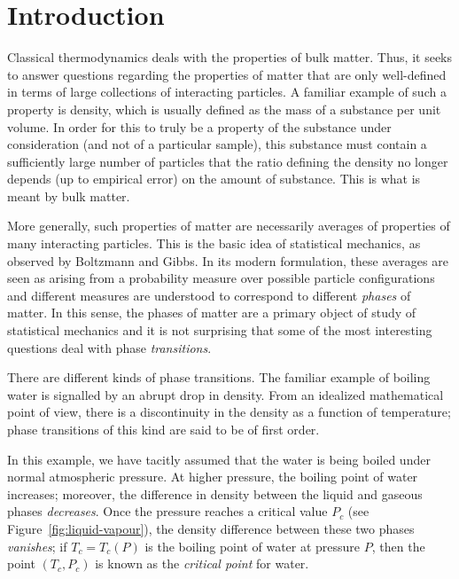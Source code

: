
\chapter{Introduction}


Classical thermodynamics deals with the properties of bulk matter. Thus, it seeks
to answer questions regarding the properties of matter that are only well-defined
in terms of large collections of interacting particles. A familiar example of
such a property is density, which is usually defined as the mass of a substance
per unit volume. In order for this to truly be a property of the substance under
consideration (and not of a particular sample), this substance must contain a
sufficiently large number of particles that the ratio defining the density
no longer depends (up to empirical error) on the amount of substance. This is
what is meant by bulk matter.

More generally, such properties of matter are necessarily averages of properties
of many interacting particles. This is the basic idea of statistical mechanics,
as observed by Boltzmann and Gibbs. In its modern formulation, these averages
are seen as arising from a probability measure over possible particle configurations
and different measures are understood to correspond to different \emph{phases}
of matter. In this sense, the phases of matter are a primary object of study
of statistical mechanics and it is not surprising that some of the most interesting
questions deal with phase \emph{transitions}.

There are different kinds of phase transitions. The familiar example of boiling
water is signalled by an abrupt drop in density. From an idealized mathematical
point of view, there is a discontinuity in the density as a function of temperature;
phase transitions of this kind are said to be of first order.

In this example,
we have tacitly assumed that the water is being boiled under normal atmospheric
pressure. At higher pressure, the boiling point of water increases; moreover,
the difference in density between the liquid and gaseous phases \emph{decreases}.
Once the pressure reaches a critical value $P_c$ (see Figure~\ref{fig:liquid-vapour}),
the density difference between
these two phases \emph{vanishes}; if $T_c = T_c(P)$ is the boiling point of water
at pressure $P$, then the point $(T_c, P_c)$ is known as the \emph{critical point}
for water.

